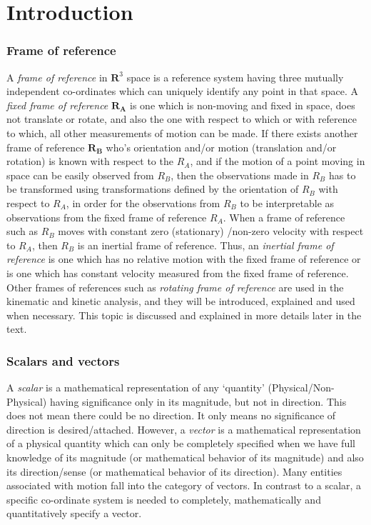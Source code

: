 \chapter{Introduction}

\subsection{Frame of reference}
A \textit{frame of reference} in $\mathbf{R}^3$ space is a reference system having three mutually independent co-ordinates which can uniquely identify any point in that space. A \textit{fixed frame of reference} $\mathbf{R_A}$ is one which is non-moving and fixed in space, does not translate or rotate, and also the one with respect to which or with reference to which, all other measurements of motion can be made. If there exists another frame of reference $\mathbf{R_B}$ who's orientation and/or motion (translation and/or rotation) is known with respect to the $R_A$, and if the motion of a point moving in space can be easily observed from $R_B$, then the observations made in $R_B$ has to be transformed using transformations defined by the orientation of $R_B$ with respect to $R_A$, in order for the observations from $R_B$ to be interpretable as observations from the fixed frame of reference $R_A$. When a frame of reference such as $R_B$ moves with constant zero (stationary) /non-zero velocity with respect to $R_A$, then $R_B$ is an inertial frame of reference. Thus, an \textit{inertial frame of reference} is one which has no relative motion with the fixed frame of reference or is one which has constant velocity measured from the fixed frame of reference. Other frames of references such as \textit{rotating frame of reference} are used in the kinematic and kinetic analysis, and they will be introduced, explained and used when necessary. This topic is discussed and explained in more details later in the text.
	
\subsection{Scalars and vectors}
A \textit{scalar} is a mathematical representation of any `quantity' (Physical/Non-Physical) having significance only in its magnitude, but not in direction. This does not mean there could be no direction. It only means no significance of direction is desired/attached. However, a \textit{vector} is a mathematical representation of a physical quantity which can only be completely specified when we have full knowledge of its magnitude (or mathematical behavior of its magnitude) and also its direction/sense (or mathematical behavior of its direction). Many entities associated with motion fall into the category of vectors. In contrast to a scalar, a specific co-ordinate system is needed to completely, mathematically and quantitatively specify a vector.
	
